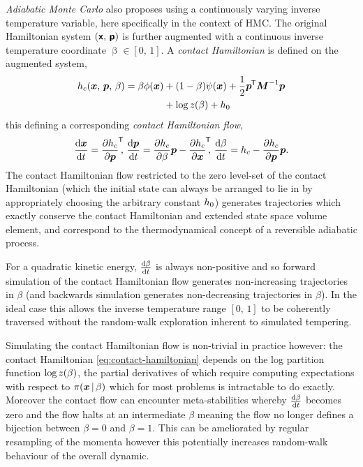 \emph{Adiabatic Monte Carlo} \citep{betancourt2014adiabatic} also proposes using a continuously varying inverse temperature variable, here specifically in the context of \ac{HMC}. The original Hamiltonian system $(\boldsymbol{\mathsf{x}},\,\boldsymbol{\mathsf{p}})$ is further augmented with a continuous inverse temperature coordinate $\upbeta \in [0,\,1]$. %
A \emph{contact Hamiltonian} is defined on the augmented system, 
\begin{equation}\label{eq:contact-hamiltonian}
\begin{split}
  h_c(\boldsymbol{x},\,\boldsymbol{p},\,\beta) = \beta \phi(\boldsymbol{x}) &+ ( 1 - \beta ) \psi(\boldsymbol{x}) 
  + \frac{1}{2}\boldsymbol{p}^{\mkern-1.5mu\mathsf{T}}\boldsymbol{M}^{-1}\boldsymbol{p} \\
  &+ \log z(\beta) + h_0
\end{split}
\end{equation}
this defining a corresponding \emph{contact Hamiltonian flow}, 
\begin{equation}\label{eq:contact-hamiltonian-flow}
  \frac{\mathrm{d} \boldsymbol{x}}{\mathrm{d} t} = \frac{\partial h_c}{\partial \boldsymbol{p}}^{\mkern-1.5mu\mathsf{T}}\kern-3pt,\,
  \frac{\mathrm{d} \boldsymbol{p}}{\mathrm{d} t} = \frac{\partial h_c}{\partial \beta} \boldsymbol{p} -\frac{\partial h_c}{\partial \boldsymbol{x}}^{\mkern-1.5mu\mathsf{T}}\kern-3pt,\,
  \frac{\mathrm{d} \beta}{\mathrm{d} t} = h_c - \frac{\partial h_c}{\partial \boldsymbol{p}}\boldsymbol{p}.
\end{equation}
The contact Hamiltonian flow restricted to the zero level-set of the contact Hamiltonian (which the initial state can always be arranged to lie in by appropriately choosing the arbitrary constant $h_0$) generates trajectories which exactly conserve the contact Hamiltonian and extended state space volume element, and correspond to the thermodynamical concept of a reversible adiabatic process. 

For a quadratic kinetic energy, $\frac{\mathrm{d} \beta}{\mathrm{d} t}$ is always non-positive and so forward simulation of the contact Hamiltonian flow generates non-increasing trajectories in $\beta$ (and backwards simulation generates non-decreasing trajectories in $\beta$). In the ideal case this allows the inverse temperature range $[0,\,1]$ to be coherently traversed without the random-walk exploration inherent to simulated tempering.

Simulating the contact Hamiltonian flow is non-trivial in practice however: the contact Hamiltonian \eqref{eq:contact-hamiltonian} depends on the log partition function $\log z(\beta)$, the partial derivatives of which require computing expectations with respect to $\pi(\boldsymbol{x}\operatorname{|}\beta)$ which for most problems is intractable to do exactly. Moreover the contact flow can encounter meta-stabilities whereby $\frac{\mathrm{d} \beta}{\mathrm{d} t}$ becomes zero and the flow halts at an intermediate $\beta$ meaning the flow no longer defines a bijection between $\beta=0$ and $\beta=1$. This can be ameliorated by regular resampling of the momenta however this potentially increases random-walk behaviour of the overall dynamic.

